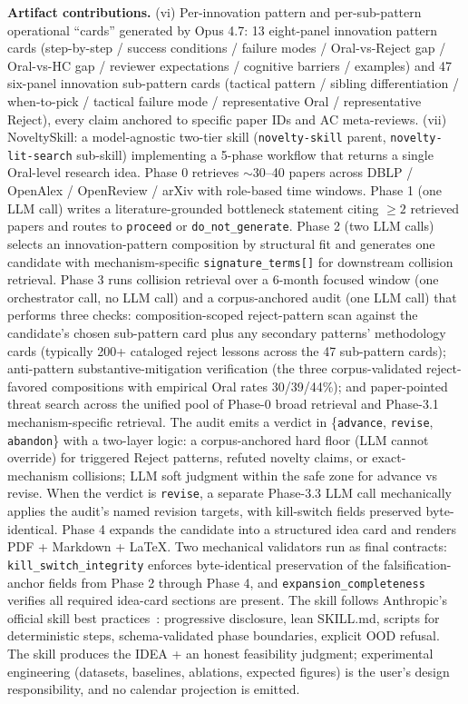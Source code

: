 \documentclass[10pt,a4paper]{article}
\begin{document}
\textbf{Artifact contributions.}
(vi) Per-innovation pattern and per-sub-pattern operational ``cards'' generated by Opus 4.7: 13 eight-panel innovation pattern cards (step-by-step / success conditions / failure modes / Oral-vs-Reject gap / Oral-vs-HC gap / reviewer expectations / cognitive barriers / examples) and 47 six-panel innovation sub-pattern cards (tactical pattern / sibling differentiation / when-to-pick / tactical failure mode / representative Oral / representative Reject), every claim anchored to specific paper IDs and AC meta-reviews.
(vii) NoveltySkill: a model-agnostic two-tier skill (\texttt{novelty-skill} parent, \texttt{novelty-lit-search} sub-skill) implementing a 5-phase workflow that returns a single Oral-level research idea. Phase 0 retrieves $\sim$30--40 papers across DBLP / OpenAlex / OpenReview / arXiv with role-based time windows. Phase 1 (one LLM call) writes a literature-grounded bottleneck statement citing $\geq 2$ retrieved papers and routes to \texttt{proceed} or \texttt{do\_not\_generate}. Phase 2 (two LLM calls) selects an innovation-pattern composition by structural fit and generates one candidate with mechanism-specific \texttt{signature\_terms[]} for downstream collision retrieval. Phase 3 runs collision retrieval over a 6-month focused window (one orchestrator call, no LLM call) and a corpus-anchored audit (one LLM call) that performs three checks: composition-scoped reject-pattern scan against the candidate's chosen sub-pattern card plus any secondary patterns' methodology cards (typically 200+ cataloged reject lessons across the 47 sub-pattern cards); anti-pattern substantive-mitigation verification (the three corpus-validated reject-favored compositions with empirical Oral rates 30/39/44\%); and paper-pointed threat search across the unified pool of Phase-0 broad retrieval and Phase-3.1 mechanism-specific retrieval. The audit emits a verdict in \{\texttt{advance}, \texttt{revise}, \texttt{abandon}\} with a two-layer logic: a corpus-anchored hard floor (LLM cannot override) for triggered Reject patterns, refuted novelty claims, or exact-mechanism collisions; LLM soft judgment within the safe zone for advance vs revise. When the verdict is \texttt{revise}, a separate Phase-3.3 LLM call mechanically applies the audit's named revision targets, with kill-switch fields preserved byte-identical. Phase 4 expands the candidate into a structured idea card and renders PDF + Markdown + LaTeX. Two mechanical validators run as final contracts: \texttt{kill\_switch\_integrity} enforces byte-identical preservation of the falsification-anchor fields from Phase 2 through Phase 4, and \texttt{expansion\_completeness} verifies all required idea-card sections are present. The skill follows Anthropic's official skill best practices~\cite{anthropic_skill_bp_2025}: progressive disclosure, lean SKILL.md, scripts for deterministic steps, schema-validated phase boundaries, explicit OOD refusal. The skill produces the IDEA + an honest feasibility judgment; experimental engineering (datasets, baselines, ablations, expected figures) is the user's design responsibility, and no calendar projection is emitted.
\end{document}
